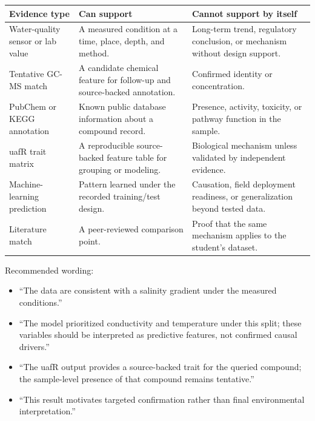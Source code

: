 \begin{longtable}{p{}p{}p{}}
\toprule
\textbf{Evidence type} & \textbf{Can support} & \textbf{Cannot support by itself} \\
\midrule
Water-quality sensor or lab value & A measured condition at a time, place, depth, and method. & Long-term trend, regulatory conclusion, or mechanism without design support. \\
Tentative GC-MS match & A candidate chemical feature for follow-up and source-backed annotation. & Confirmed identity or concentration. \\
PubChem or KEGG annotation & Known public database information about a compound record. & Presence, activity, toxicity, or pathway function in the sample. \\
uafR trait matrix & A reproducible source-backed feature table for grouping or modeling. & Biological mechanism unless validated by independent evidence. \\
Machine-learning prediction & Pattern learned under the recorded training/test design. & Causation, field deployment readiness, or generalization beyond tested data. \\
Literature match & A peer-reviewed comparison point. & Proof that the same mechanism applies to the student's dataset. \\
\bottomrule
\end{longtable}

Recommended wording:
\begin{itemize}
  \item ``The data are consistent with a salinity gradient under the measured conditions.''
  \item ``The model prioritized conductivity and temperature under this split; these variables should be interpreted as predictive features, not confirmed causal drivers.''
  \item ``The uafR output provides a source-backed trait for the queried compound; the sample-level presence of that compound remains tentative.''
  \item ``This result motivates targeted confirmation rather than final environmental interpretation.''
\end{itemize}

